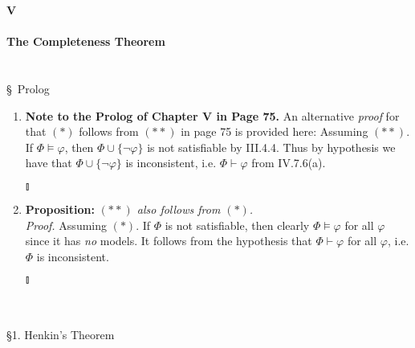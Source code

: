 {\LARGE \bfseries V \\ \\ The Completeness Theorem}
\\
\\
\\
{\large \S \ Prolog}
\begin{enumerate}[1.]
\item \textbf{Note to the Prolog of Chapter V in Page 75.} An alternative \emph{proof} for that $(*)$ follows from $(**)$ in page 75 is provided here: Assuming $(**)$. If $\Phi \models \varphi$, then $\Phi \cup \{ \neg \varphi \}$ is not satisfiable by III.4.4. Thus by hypothesis we have that $\Phi \cup \{ \neg \varphi \}$ is inconsistent, i.e. $\Phi \vdash \varphi$ from IV.7.6(a). \begin{flushright}$\talloblong$\end{flushright}
%
\item \textbf{Proposition:} \textit{$(**)$ also follows from $(*)$.}\\
\emph{Proof.} Assuming $(*)$. If $\Phi$ is not satisfiable, then clearly $\Phi \models \varphi$ for all $\varphi$ since it has \emph{no} models. It follows from the hypothesis that $\Phi \vdash \varphi$ for all $\varphi$, i.e. $\Phi$ is inconsistent. \begin{flushright}$\talloblong$\end{flushright}
\end{enumerate}
\ 
\\
\\
{\large \S1. Henkin's Theorem}
